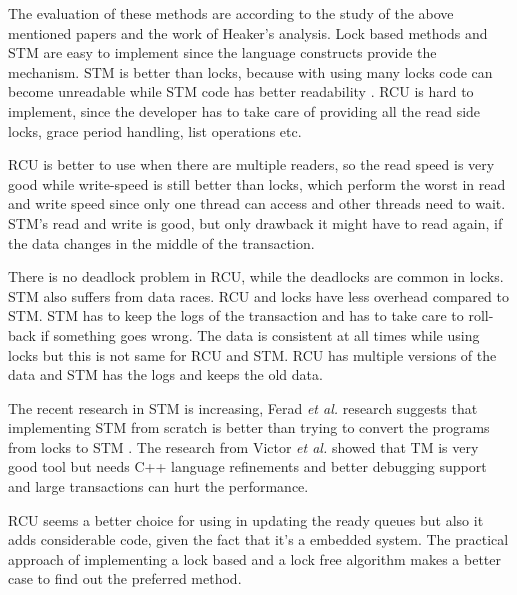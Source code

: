The evaluation of these methods are according to the study of the above mentioned papers and the work of Heaker's analysis. Lock based methods and STM are easy to implement since the language constructs provide the mechanism. STM is better than locks, because with using many locks code can become unreadable while STM code has better readability \cite{pankratius2014software}. RCU is hard to implement, since the developer has to take care of providing all the read side locks, grace period handling, list operations etc.

RCU is better to use when there are multiple readers, so the read speed is very good while write-speed is still better than locks, which perform the worst in read and write speed since only one thread can access and other threads need to wait. STM's read and write is good, but only drawback it might have to read again, if the data changes in the middle of the transaction.

There is no deadlock problem in RCU, while the deadlocks are common in locks. STM also suffers from data races. RCU and locks have less overhead compared to STM. STM has to keep the logs of the transaction and has to take care to roll-back if something goes wrong. The data is consistent at all times while using locks but this is not same for RCU and STM. RCU has multiple versions of the data and STM has the logs and keeps the old data.

The recent research in STM is increasing, Ferad \emph{et al.} research suggests that implementing STM from scratch is better than trying to convert the programs from locks to STM \cite{zyulkyarov2009atomic}. The research from Victor \emph{et al.} \cite{pankratius2014software} showed that  TM is very good tool but needs C++ language refinements and better debugging support and large transactions can hurt the performance.

RCU seems a better choice for using in updating the ready queues but also it adds considerable code, given the fact that it's a embedded system. The practical approach of implementing a lock based and a lock free algorithm makes   a better case to find out the preferred method.

